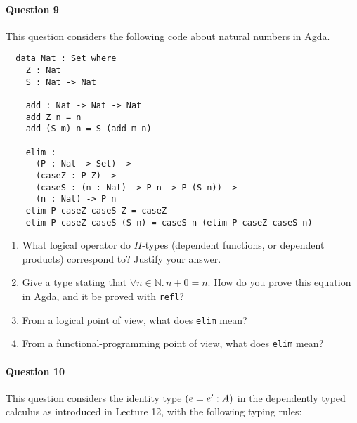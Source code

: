 \documentclass[11pt,a4paper,twoside]{article}
\begin{document}
\paragraph{Question 9} This question considers the following code about natural numbers in Agda.
\begin{lstlisting}
  data Nat : Set where
    Z : Nat
    S : Nat -> Nat

    add : Nat -> Nat -> Nat
    add Z n = n
    add (S m) n = S (add m n)

    elim : 
      (P : Nat -> Set) -> 
      (caseZ : P Z) -> 
      (caseS : (n : Nat) -> P n -> P (S n)) -> 
      (n : Nat) -> P n
    elim P caseZ caseS Z = caseZ
    elim P caseZ caseS (S n) = caseS n (elim P caseZ caseS n)
\end{lstlisting}
\begin{enumerate}[label=(\alph*)]
  \item What logical operator do $\Pi$-types (dependent functions, or dependent products) correspond to? 
  Justify your answer.

  \item Give a type stating that $\forall n\in \mathbb{N}.\, n + 0 = n$.
  How do you prove this equation in Agda, and it be proved with \texttt{refl}?

  \item From a logical point of view, what does \texttt{elim} mean?

  \item From a functional-programming point of view, what does \texttt{elim} mean?
\end{enumerate}


\paragraph{Question 10} This question considers the identity type $\id{e}{e'}{A}$
in the dependently typed calculus as introduced in Lecture 12,
with the following typing rules:
\begin{center}
  \begin{bprooftree}
  \end{bprooftree}
  \
  \begin{bprooftree}
  \end{bprooftree}

  \vspace{1em}

  \begin{bprooftree}
  \end{bprooftree}
\end{center}
\end{document}
